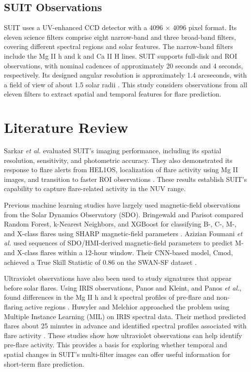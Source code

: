 \documentclass[oneside]{ieeeaccess}
\begin{document}
\subsection{SUIT Observations}

SUIT uses a UV-enhanced CCD detector with a 4096 $\times$ 4096 pixel format. Its eleven science filters comprise eight narrow-band and three broad-band filters, covering different spectral regions and solar features. The narrow-band filters include the Mg II h and k and Ca II H lines. SUIT supports full-disk and ROI observations, with nominal cadences of approximately 20 seconds and 4 seconds, respectively. Its designed angular resolution is approximately 1.4 arcseconds, with a field of view of about 1.5 solar radii \cite{ref2}. This study considers observations from all eleven filters to extract spatial and temporal features for flare prediction.

\section{Literature Review}

Sarkar \textit{et al.} evaluated SUIT's imaging performance, including its spatial resolution, sensitivity, and photometric accuracy. They also demonstrated its response to flare alerts from HEL1OS, localization of flare activity using Mg II images, and transition to faster ROI observations \cite{ref4}. These results establish SUIT's capability to capture flare-related activity in the NUV range.

Previous machine learning studies have largely used magnetic-field observations from the Solar Dynamics Observatory (SDO). Bringewald and Parisot compared Random Forest, k-Nearest Neighbors, and XGBoost for classifying B-, C-, M-, and X-class flares using SHARP magnetic-field parameters \cite{ref5}. Azizian Foumani \textit{et al.} used sequences of SDO/HMI-derived magnetic-field parameters to predict M- and X-class flares within a 12-hour window. Their CNN-based model, Cmod, achieved a True Skill Statistic of 0.86 on the SWAN-SF dataset \cite{ref6}.

Ultraviolet observations have also been used to study signatures that appear before solar flares. Using IRIS observations, Panos and Kleint, and Panos \textit{et al.}, found differences in the Mg II h and k spectral profiles of pre-flare and non-flaring active regions \cite{ref8,ref7}. Huwyler and Melchior approached the problem using Multiple Instance Learning (MIL) on IRIS spectral data. Their method predicted flares about 25 minutes in advance and identified spectral profiles associated with flare activity \cite{ref9}. These studies show how ultraviolet observations can help identify pre-flare activity. This provides a basis for exploring whether temporal and spatial changes in SUIT's multi-filter images can offer useful information for short-term flare prediction.
\end{document}
